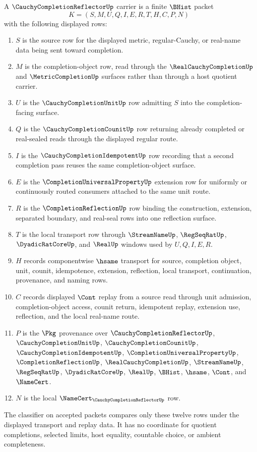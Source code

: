 \begin{definition}
\label{def:cauchy-completion-reflector-carrier}
A $\CauchyCompletionReflectorUp$ carrier is a finite $\BHist$ packet
$$
K=(S,M,U,Q,I,E,R,T,H,C,P,N)
$$
with the following displayed rows:
\begin{enumerate}
\item $S$ is the source row for the displayed metric, regular-Cauchy, or real-name data being sent toward completion.
\item $M$ is the completion-object row, read through the $\RealCauchyCompletionUp$ and $\MetricCompletionUp$ surfaces rather than through a host quotient carrier.
\item $U$ is the $\CauchyCompletionUnitUp$ row admitting $S$ into the completion-facing surface.
\item $Q$ is the $\CauchyCompletionCounitUp$ row returning already completed or real-sealed reads through the displayed regular route.
\item $I$ is the $\CauchyCompletionIdempotentUp$ row recording that a second completion pass reuses the same completion-object surface.
\item $E$ is the $\CompletionUniversalPropertyUp$ extension row for uniformly or continuously routed consumers attached to the same unit route.
\item $R$ is the $\CompletionReflectionUp$ row binding the construction, extension, separated boundary, and real-seal rows into one reflection surface.
\item $T$ is the local transport row through $\StreamNameUp$, $\RegSeqRatUp$, $\DyadicRatCoreUp$, and $\RealUp$ windows used by $U,Q,I,E,R$.
\item $H$ records componentwise $\hsame$ transport for source, completion object, unit, counit, idempotence, extension, reflection, local transport, continuation, provenance, and naming rows.
\item $C$ records displayed $\Cont$ replay from a source read through unit admission, completion-object access, counit return, idempotent replay, extension use, reflection, and the local real-name route.
\item $P$ is the $\Pkg$ provenance over $\CauchyCompletionReflectorUp$, $\CauchyCompletionUnitUp$, $\CauchyCompletionCounitUp$, $\CauchyCompletionIdempotentUp$, $\CompletionUniversalPropertyUp$, $\CompletionReflectionUp$, $\RealCauchyCompletionUp$, $\StreamNameUp$, $\RegSeqRatUp$, $\DyadicRatCoreUp$, $\RealUp$, $\BHist$, $\hsame$, $\Cont$, and $\NameCert$.
\item $N$ is the local $\NameCert_{\CauchyCompletionReflectorUp}$ row.
\end{enumerate}
The classifier on accepted packets compares only these twelve rows under the displayed transport and replay data. It has no coordinate for quotient completions, selected limits, host equality, countable choice, or ambient completeness.
\end{definition}

